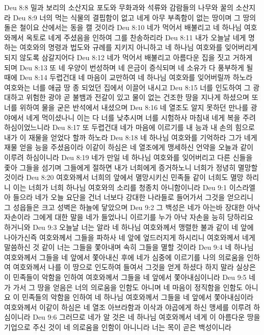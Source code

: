 Deu 8:8  밀과 보리의 소산지요 포도와 무화과와 석류와 감람들의 나무와 꿀의 소산지라
Deu 8:9  너의 먹는 식물의 결핍함이 없고 네게 아무 부족함이 없는 땅이며 그 땅의 돌은 철이요 산에서는 동을 캘 것이라
Deu 8:10  네가 먹어서 배불리고 네 하나님 여호와께서 옥토로 네게 주셨음을 인하여 그를 찬송하리라
Deu 8:11  내가 오늘날 네게 명하는 여호와의 명령과 법도와 규례를 지키지 아니하고 네 하나님 여호와를 잊어버리게 되지 않도록 삼갈지어다
Deu 8:12  네가 먹어서 배불리고 아름다운 집을 짓고 거하게 되며
Deu 8:13  또 네 우양이 번성하며 네 은금이 증식되며 네 소유가 다 풍부하게 될 때에
Deu 8:14  두렵건대 네 마음이 교만하여 네 하나님 여호와를 잊어버릴까 하노라 여호와는 너를 애굽 땅 종 되었던 집에서 이끌어 내시고
Deu 8:15  너를 인도하여 그 광대하고 위험한 광야 곧 불뱀과 전갈이 있고 물이 없는 건조한 땅을 지나게 하셨으며 또 너를 위하여 물을 굳은 반석에서 내셨으며
Deu 8:16  네 열조도 알지 못하던 만나를 광야에서 네게 먹이셨나니 이는 다 너를 낮추시며 너를 시험하사 마침내 네게 복을 주려 하심이었느니라
Deu 8:17  또 두렵건대 네가 마음에 이르기를 내 능과 내 손의 힘으로 내가 이 재물을 얻었다 할까 하노라
Deu 8:18  네 하나님 여호와를 기억하라 그가 네게 재물 얻을 능을 주셨음이라 이같이 하심은 네 열조에게 맹세하신 언약을 오늘과 같이 이루려 하심이니라
Deu 8:19  네가 만일 네 하나님 여호와를 잊어버리고 다른 신들을 좇아 그들을 섬기며 그들에게 절하면 내가 너희에게 증거하노니 너희가 정녕히 멸망할 것이라
Deu 8:20  여호와께서 너희의 앞에서 멸망시키신 민족들 같이 너희도 멸망 하리니 이는 너희가 너희 하나님 여호와의 소리를 청종치 아니함이니라
Deu 9:1  이스라엘아 들으라 네가 오늘 요단을 건너 너보다 강대한 나라들로 들어가서 그것을 얻으리니 그 성읍들은 크고 성벽은 하늘에 닿았으며
Deu 9:2  그 백성은 네가 아는바 장대한 아낙 자손이라 그에게 대한 말을 네가 들었나니 이르기를 누가 아낙 자손을 능히 당하리요 하거니와
Deu 9:3  오늘날 너는 알라 네 하나님 여호와께서 맹렬한 불과 같이 네 앞에 나아가신즉 여호와께서 그들을 파하사 네 앞에 엎드러지게 하시리니 여호와께서 네게 말씀하신 것 같이 너는 그들을 쫓아내며 속히 그들을 멸할 것이라
Deu 9:4  네 하나님 여호와께서 그들을 네 앞에서 쫓아내신 후에 네가 심중에 이르기를 나의 의로움을 인하여 여호와께서 나를 이 땅으로 인도하여 들여서 그것을 얻게 하셨다 하지 말라 실상은 이 민족들이 악함을 인하여 여호와께서 그들을 네 앞에서 쫓아내심이니라
Deu 9:5  네가 가서 그 땅을 얻음은 너의 의로움을 인함도 아니며 네 마음이 정직함을 인함도 아니요 이 민족들의 악함을 인하여 네 하나님 여호와께서 그들을 네 앞에서 쫓아내심이라 여호와께서 이같이 하심은 네 열조 아브라함과 이삭과 야곱에게 하신 맹세를 이루려 하심이니라
Deu 9:6  그러므로 네가 알 것은 네 하나님 여호와께서 네게 이 아름다운 땅을 기업으로 주신 것이 네 의로움을 인함이 아니니라 너는 목이 곧은 백성이니라
